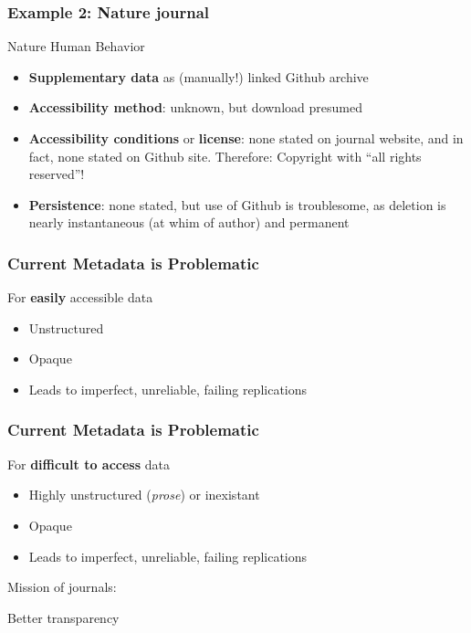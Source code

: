 \begin{frame}
\frametitle{Example 2: Nature journal}
\begin{block}{Nature Human Behavior}
\begin{itemize}
\item \textbf{Supplementary data} as (manually!) linked Github archive
\item \textbf{Accessibility method}: unknown, but download presumed
\item \textbf{Accessibility conditions} or \textbf{license}: none stated on journal website, and in fact, none stated on Github site. Therefore: {\color{red}Copyright with ``all rights reserved''}!
\item \textbf{Persistence}: none stated, but use of Github is troublesome, as deletion is nearly instantaneous (at whim of author) and permanent 
\end{itemize}
\end{block}
\end{frame}


\begin{frame}
\frametitle{Current Metadata is Problematic}
\begin{block}{For \textbf{easily} accessible data}
	\begin{itemize}
		\item Unstructured
		\item Opaque
		\item Leads to imperfect, unreliable, failing replications
	\end{itemize}
\end{block}
\end{frame}


\begin{frame}
\frametitle{Current Metadata is Problematic}
\begin{block}{For \textbf{difficult to access} data}
	\begin{itemize}
		\item Highly unstructured (\textit{prose}) or inexistant
		\item Opaque
		\item Leads to imperfect, unreliable, failing replications
	\end{itemize}
\end{block}
\end{frame}



\begin{frame}
\begin{center}
	\huge Mission of journals: 
	
	Better transparency
\end{center}
\end{frame}



